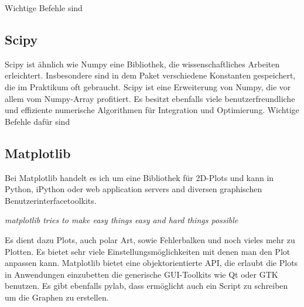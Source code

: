   Wichtige Befehle sind

\subsection{Scipy}
  Scipy ist ähnlich wie Numpy eine Bibliothek, die wissenschaftliches Arbeiten erleichtert.
  Insbesondere sind in dem Paket verschiedene Konstanten gespeichert, die im Praktikum oft gebraucht.
  Scipy ist eine Erweiterung von Numpy, die vor allem vom Numpy-Array profitiert.
  Es besitzt ebenfalls viele benutzerfreundliche und effiziente numerische Algorithmen für Integration und Optimierung.
  Wichtige Befehle dafür sind
\subsection{Matplotlib}
  Bei Matplotlib handelt es ich um eine Bibliothek für 2D-Plots und kann in Python, iPython oder web application servers and diversen graphischen Benutzerinterfacetoolkits.


  \textit{matplotlib tries to make easy things easy and hard things possible}


  Es dient dazu Plots, auch polar Art, sowie Fehlerbalken und noch vieles mehr zu Plotten.
  Es bietet sehr viele Einstellungsmöglichkeiten mit denen man den Plot anpassen kann.
  Matplotlib bietet eine objektorientierte API, die erlaubt die Plots in Anwendungen einzubetten die generische GUI-Toolkits wie Qt oder GTK benutzen.
  Es gibt ebenfalls pylab, dass ermöglicht auch ein Script zu schreiben um die Graphen zu erstellen.

